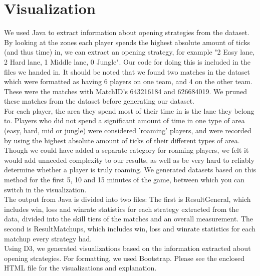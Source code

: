 \documentclass[a4paper,11pt]{article}
\begin{document}
\section{Visualization}
We used Java to extract information about opening strategies from the dataset. By looking at the zones each player spends the highest absolute amount of ticks (and thus time) in, we can extract an opening strategy, for example "2 Easy lane, 2 Hard lane, 1 Middle lane, 0 Jungle". Our code for doing this is included in the files we handed in.
It should be noted that we found two matches in the dataset which were formatted as having 6 players on one team, and 4 on the other team. These were the matches with MatchID's 643216184 and 626684019. We pruned these matches from the dataset before generating our dataset.\\


For each player, the area they spend most of their time in is the lane they belong to. Players who did not spend a significant amount of time in one type of area (easy, hard, mid or jungle) were considered 'roaming' players, and were recorded by using the highest absolute amount of ticks of their different types of area. Though we could have added a separate category for roaming players, we felt it would add unneeded complexity to our results, as well as be very hard to reliably determine whether a player is truly roaming. We generated datasets based on this method for the first 5, 10 and 15 minutes of the game, between which you can switch in the visualization.\\

 
The output from Java is divided into two files: The first is ResultGeneral, which includes win, loss and winrate statistics for each strategy extracted from the data, divided into the skill tiers of the matches and an overall measurement. The second is ResultMatchups, which includes win, loss and winrate statistics for each matchup every strategy had.\\

Using D3, we generated visualizations based on the information extracted about opening strategies. For formatting, we used Bootstrap.
Please see the enclosed HTML file for the visualizations and explanation.




  
\end{document}
